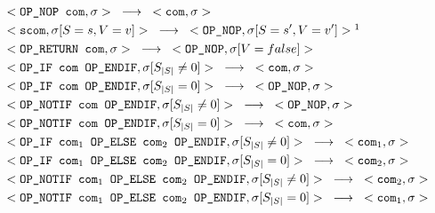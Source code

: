 \documentclass{article}
\begin{document}
\begin{align*}
&<\texttt{OP\_NOP com}, \sigma> 
    \hspace{3mm}
\longrightarrow 
    \hspace{3mm}
<\texttt{com}, \sigma>
\\
&<\texttt{scom}, \sigma[S=s, V=v]> 
    \hspace{3mm}
\longrightarrow 
    \hspace{3mm}
<\texttt{OP\_NOP}, \sigma[S=s', V=v']>\footnotemark
\\
&<\texttt{OP\_RETURN com}, \sigma> 
    \hspace{3mm}
\longrightarrow 
    \hspace{3mm}
<\texttt{OP\_NOP}, \sigma[V = false]>
\\
&<\texttt{OP\_IF com OP\_ENDIF}, \sigma[S_{|S|} \neq 0]> 
    \hspace{3mm}
\longrightarrow 
    \hspace{3mm}
<\texttt{com}, \sigma> 
\\
&<\texttt{OP\_IF com OP\_ENDIF}, \sigma[S_{|S|} = 0]> 
    \hspace{3mm}
\longrightarrow 
    \hspace{3mm}
<\texttt{OP\_NOP}, \sigma> 
\\
&<\texttt{OP\_NOTIF com OP\_ENDIF}, \sigma[S_{|S|} \neq 0]> 
    \hspace{3mm}
\longrightarrow 
    \hspace{3mm}
<\texttt{OP\_NOP}, \sigma> 
\\
&<\texttt{OP\_NOTIF com OP\_ENDIF}, \sigma[S_{|S|} = 0]> 
    \hspace{3mm}
\longrightarrow 
    \hspace{3mm}
<\texttt{com}, \sigma> 
\\
&<\texttt{OP\_IF com$_1$ OP\_ELSE com$_2$ OP\_ENDIF}, \sigma[S_{|S|} \neq 0]> 
    \hspace{3mm}
\longrightarrow 
    \hspace{3mm}
<\texttt{com$_1$}, \sigma> 
\\
&<\texttt{OP\_IF com$_1$ OP\_ELSE com$_2$ OP\_ENDIF}, \sigma[S_{|S|} = 0]> 
    \hspace{3mm}
\longrightarrow 
    \hspace{3mm}
<\texttt{com$_2$}, \sigma> 
\\
&<\texttt{OP\_NOTIF com$_1$ OP\_ELSE com$_2$ OP\_ENDIF}, \sigma[S_{|S|} \neq 0]> 
    \hspace{3mm}
\longrightarrow 
    \hspace{3mm}
<\texttt{com$_2$}, \sigma> 
\\
&<\texttt{OP\_NOTIF com$_1$ OP\_ELSE com$_2$ OP\_ENDIF}, \sigma[S_{|S|} = 0]> 
    \hspace{3mm}
\longrightarrow 
    \hspace{3mm}
<\texttt{com$_1$}, \sigma> 
\\
\end{align*}
\end{document}
